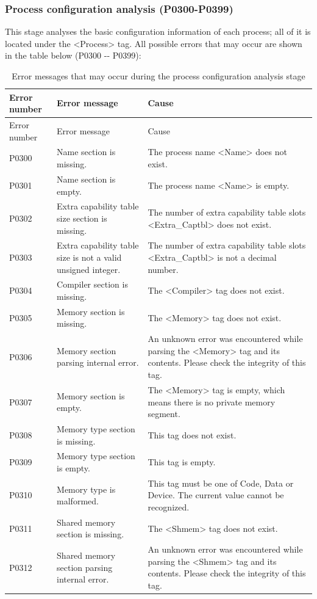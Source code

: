 \subsubsection{Process configuration analysis (P0300-P0399)}\label{subsubsec:5-6-2-4}

This stage analyses the basic configuration information of each process; all of it is located under the <Process> tag. All possible errors that may occur are shown in the table below (P0300
-\/- P0399):

\begin{xltabular}{\textwidth}{@{}>{\hsize\raggedright\arraybackslash}X>{\hsize\raggedright\arraybackslash}X>{\hsize\raggedright\arraybackslash}X@{}}
\caption{Error messages that may occur during the process configuration analysis stage}\label{tab:5-6}\\
\toprule
Error number & Error message & Cause\tabularnewline
\endfirsthead
\toprule
Error number & Error message & Cause\tabularnewline
\midrule
\endhead
\bottomrule
\endlastfoot
P0300 & Name section is missing. &
The process name <Name> does not exist.\tabularnewline
P0301 & Name section is empty. &
The process name <Name> is empty.\tabularnewline
P0302 & Extra capability table size section is missing. &
The number of extra capability table slots <Extra\_\allowbreak{}Captbl> does not exist.\tabularnewline
P0303 & Extra capability table size is not a valid unsigned integer. &
The number of extra capability table slots <Extra\_\allowbreak{}Captbl> is not a decimal number.\tabularnewline
P0304 & Compiler section is missing. &
The <Compiler> tag does not exist.\tabularnewline
P0305 & Memory section is missing. &
The <Memory> tag does not exist.\tabularnewline
P0306 & Memory section parsing internal error. &
An unknown error was encountered while parsing the <Memory> tag and its contents. Please check the integrity of this tag.\tabularnewline
P0307 & Memory section is empty. &
The <Memory> tag is empty, which means there is no private memory segment.\tabularnewline
P0308 & Memory type section is missing. & This tag does not exist.\tabularnewline
P0309 & Memory type section is empty. & This tag is empty.\tabularnewline
P0310 & Memory type is malformed. & This tag must be one of Code, Data or Device. The current value cannot be recognized.\tabularnewline
P0311 & Shared memory section is missing. &
The <Shmem> tag does not exist.\tabularnewline
P0312 & Shared memory section parsing internal error. &
An unknown error was encountered while parsing the <Shmem> tag and its contents. Please check the integrity of this tag.\tabularnewline

\end{xltabular}
